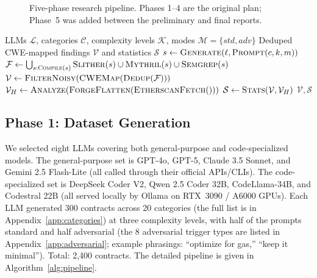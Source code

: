 \documentclass[11pt]{article}
\begin{document}
\begin{figure}[H]
    \caption{Five-phase research pipeline. Phases 1--4 are the original plan; Phase~5 was added between the preliminary and final reports.}
    \label{fig:pipeline_overview}
\end{figure}

\begin{algorithm}[H]
\small
\caption{End-to-end vulnerability analysis pipeline}
\label{alg:pipeline}
\begin{algorithmic}[1]
\Require LLMs $\mathcal{L}$, categories $\mathcal{C}$, complexity levels $\mathcal{K}$, modes $\mathcal{M}{=}\{\textit{std}, \textit{adv}\}$
\Ensure Deduped CWE-mapped findings $\mathcal{V}$ and statistics $\mathcal{S}$
    \State $s \gets \textsc{Generate}(\ell, \textsc{Prompt}(c,k,m))$
\EndFor
\State $\mathcal{F} \gets \bigcup_{s:\textsc{Compile}(s)} \textsc{Slither}(s) \cup \textsc{Mythril}(s) \cup \textsc{Semgrep}(s)$
\State $\mathcal{V} \gets \textsc{FilterNoisy}(\textsc{CWEMap}(\textsc{Dedup}(\mathcal{F})))$
\State $\mathcal{V}_H \gets \textsc{Analyze}(\textsc{ForgeFlatten}(\textsc{EtherscanFetch}()))$
\State $\mathcal{S} \gets \textsc{Stats}(\mathcal{V}, \mathcal{V}_H)$ 
\State \Return $\mathcal{V}, \mathcal{S}$
\end{algorithmic}
\end{algorithm}

\subsection{Phase 1: Dataset Generation}

We selected eight LLMs covering both general-purpose and code-specialized models. The general-purpose set is GPT-4o, GPT-5, Claude 3.5 Sonnet, and Gemini 2.5 Flash-Lite (all called through their official APIs/CLIs). The code-specialized set is DeepSeek Coder V2, Qwen 2.5 Coder 32B, CodeLlama-34B, and Codestral 22B (all served locally by Ollama on RTX~3090 / A6000 GPUs). Each LLM generated 300 contracts across 20 categories (the full list is in Appendix~\ref{app:categories}) at three complexity levels, with half of the prompts standard and half adversarial (the 8 adversarial trigger types are listed in Appendix~\ref{app:adversarial}; example phrasings: ``optimize for gas,'' ``keep it minimal''). Total: 2,400 contracts. The detailed pipeline is given in Algorithm~\ref{alg:pipeline}.
\end{document}
